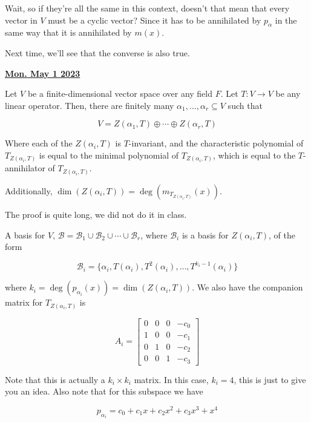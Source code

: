 \documentclass[12pt]{article}
\renewcommand{\date}[1]{\underline{\bf #1}}
\def\B{\mathcal B}
\begin{document}
  \QUESTION{} Wait, so if they're all the same in this context, doesn't that
  mean that every vector in $V$ must be a cyclic vector? Since it has to be
  annihilated by $p_\alpha$ in the same way that it is annihilated by $m(x)$.

  Next time, we'll see that the converse is also true.

  \date{Mon. May 1 2023}

  {
    Let $V$ be a finite-dimensional vector space over any field $F$. Let $T: V
    \to V$ be any linear operator. Then, there are finitely many $\alpha_1,
    \dots, \alpha_r \subseteq V$ such that

    \[
      V = Z(\alpha_1, T) \oplus \cdots \oplus Z(\alpha_r, T)
    \]

    Where each of the $Z(\alpha_i, T)$ is $T$-invariant, and the characteristic
    polynomial of $T_{Z(\alpha_i, T)}$ is equal to the minimal polynomial of
    $T_{Z(\alpha_i, T)}$, which is equal to the $T$-annihilator of
    $T_{Z(\alpha_i, T)}$.

    Additionally, $\dim(Z(\alpha_i, T)) = \deg(m_{T_{Z(\alpha_i, T)}}(x))$.
  }
  {
    The proof is quite long, we did not do it in class.
  }

  A basis for $V$, $\B = \B_1 \cup \B_2 \cup \cdots \cup \B_r$, where $\B_i$ is
  a basis for $Z(\alpha_i, T)$, of the form

  \[
    \B_i = \{\alpha_i, T(\alpha_i), T^2(\alpha_i), \dots, T^{k_i - 1}(\alpha_i)\}
  \]

  where $k_i = \deg(p_{\alpha_i}(x)) = \dim(Z(\alpha_i, T))$. We also have the
  companion matrix for $T_{Z(\alpha_i, T)}$ is

  \[
    A_i =
    \begin{bmatrix}
      0 & 0 & 0 & - c_0 \\
      1 & 0 & 0 & - c_1 \\
      0 & 1 & 0 & - c_2 \\
      0 & 0 & 1 & - c_3
    \end{bmatrix}
  \]

  Note that this is actually a $k_i \times k_i$ matrix. In this case, $k_i = 4$,
  this is just to give you an idea. Also note that for this subspace we have

  \[
    p_{\alpha_i} = c_0 + c_1 x + c_2 x^2 + c_3 x^3 + x^4
  \]
\end{document}
